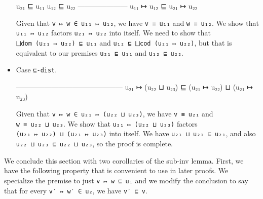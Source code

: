 \begin{itemize}
  \begin{myDisplay}
    u₂₁ ⊑ u₁₁  u₁₂ ⊑ u₂₂
    ---------------------
    u₁₁ ↦ u₁₂ ⊑ u₂₁ ↦ u₂₂
  \end{myDisplay}

  Given that \texttt{v\ ↦\ w\ ∈\ u₁₁\ ↦\ u₁₂}, we have
  \texttt{v\ ≡\ u₁₁} and \texttt{w\ ≡\ u₁₂}. We show that
  \texttt{u₁₁\ ↦\ u₁₂} factors \texttt{u₂₁\ ↦\ u₂₂} into itself. We need
  to show that \texttt{⨆dom\ (u₂₁\ ↦\ u₂₂)\ ⊑\ u₁₁} and
  \texttt{u₁₂\ ⊑\ ⨆cod\ (u₂₁\ ↦\ u₂₂)}, but that is equivalent to our
  premises \texttt{u₂₁\ ⊑\ u₁₁} and \texttt{u₁₂\ ⊑\ u₂₂}.
\item
  Case \texttt{⊑-dist}.

  \begin{myDisplay}
    ---------------------------------------------
    u₂₁ ↦ (u₂₂ ⊔ u₂₃) ⊑ (u₂₁ ↦ u₂₂) ⊔ (u₂₁ ↦ u₂₃)
  \end{myDisplay}

  Given that \texttt{v\ ↦\ w\ ∈\ u₂₁\ ↦\ (u₂₂\ ⊔\ u₂₃)}, we have
  \texttt{v\ ≡\ u₂₁} and \texttt{w\ ≡\ u₂₂\ ⊔\ u₂₃}. We show that
  \texttt{u₂₁\ ↦\ (u₂₂\ ⊔\ u₂₃)} factors
  \texttt{(u₂₁\ ↦\ u₂₂)\ ⊔\ (u₂₁\ ↦\ u₂₃)} into itself. We have
  \texttt{u₂₁\ ⊔\ u₂₁\ ⊑\ u₂₁}, and also
  \texttt{u₂₂\ ⊔\ u₂₃\ ⊑\ u₂₂\ ⊔\ u₂₃}, so the proof is complete.
\end{itemize}

We conclude this section with two corollaries of the sub-inv lemma.
First, we have the following property that is convenient to use in later
proofs. We specialize the premise to just \texttt{v\ ↦\ w\ ⊑\ u₁} and we
modify the conclusion to say that for every \texttt{v′\ ↦\ w′\ ∈\ u₂},
we have \texttt{v′\ ⊑\ v}.

